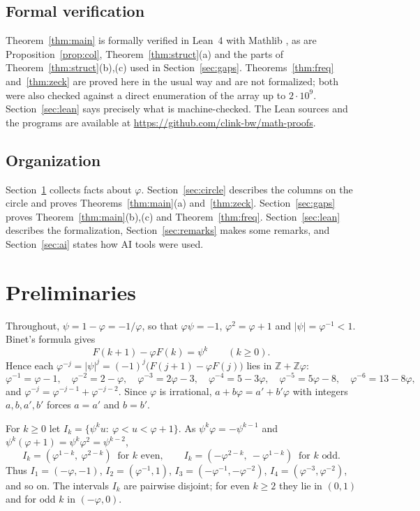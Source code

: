 \documentclass[12pt]{article}
\newcommand{\Z}{\mathbb{Z}}
\theoremstyle{plain}
\theoremstyle{remark}
\begin{document}
\subsection*{Formal verification}

Theorem~\ref{thm:main} is formally verified in Lean~4 \cite{lean4} with Mathlib \cite{mathlib},
as are Proposition~\ref{prop:col}, Theorem~\ref{thm:struct}(a) and the parts of
Theorem~\ref{thm:struct}(b),(c) used in Section~\ref{sec:gaps}. Theorems~\ref{thm:freq}
and~\ref{thm:zeck} are proved here in the usual way and are not formalized; both were also
checked against a direct enumeration of the array up to $2\cdot10^9$.
Section~\ref{sec:lean} says precisely what is machine-checked. The Lean sources and the programs
are available at \url{https://github.com/clink-bw/math-proofs}.

\subsection*{Organization}

Section~\ref{sec:prelim} collects facts about $\varphi$. Section~\ref{sec:circle} describes
the columns on the circle and proves Theorems~\ref{thm:main}(a) and~\ref{thm:zeck}.
Section~\ref{sec:gaps} proves Theorem~\ref{thm:main}(b),(c) and Theorem~\ref{thm:freq}.
Section~\ref{sec:lean} describes the formalization, Section~\ref{sec:remarks} makes some
remarks, and Section~\ref{sec:ai} states how AI tools were used.

\section{Preliminaries}\label{sec:prelim}

Throughout, $\psi=1-\varphi=-1/\varphi$, so that $\varphi\psi=-1$, $\varphi^2=\varphi+1$ and
$|\psi|=\varphi^{-1}<1$. Binet's formula gives
\begin{equation}\label{eq:binet}
F(k+1)-\varphi F(k)=\psi^k\qquad(k\ge0).
\end{equation}
Hence each $\varphi^{-j}=|\psi|^j=(-1)^j\bigl(F(j+1)-\varphi F(j)\bigr)$ lies in $\Z+\Z\varphi$:
\[
\varphi^{-1}=\varphi-1,\quad \varphi^{-2}=2-\varphi,\quad \varphi^{-3}=2\varphi-3,\quad
\varphi^{-4}=5-3\varphi,\quad \varphi^{-5}=5\varphi-8,\quad \varphi^{-6}=13-8\varphi,
\]
and $\varphi^{-j}=\varphi^{-j-1}+\varphi^{-j-2}$. Since $\varphi$ is irrational,
$a+b\varphi=a'+b'\varphi$ with integers $a,b,a',b'$ forces $a=a'$ and $b=b'$.

For $k\ge0$ let $I_k=\{\psi^k u:\ \varphi<u<\varphi+1\}$. As $\psi^k\varphi=-\psi^{k-1}$ and
$\psi^k(\varphi+1)=\psi^k\varphi^2=\psi^{k-2}$,
\begin{equation}\label{eq:Ik}
I_k=(\varphi^{1-k},\ \varphi^{2-k})\ \text{ for $k$ even},\qquad
I_k=(-\varphi^{2-k},\ -\varphi^{1-k})\ \text{ for $k$ odd}.
\end{equation}
Thus $I_1=(-\varphi,-1)$, $I_2=(\varphi^{-1},1)$, $I_3=(-\varphi^{-1},-\varphi^{-2})$,
$I_4=(\varphi^{-3},\varphi^{-2})$, and so on. The intervals $I_k$ are pairwise disjoint; for even
$k\ge2$ they lie in $(0,1)$ and for odd $k$ in $(-\varphi,0)$.
\end{document}
